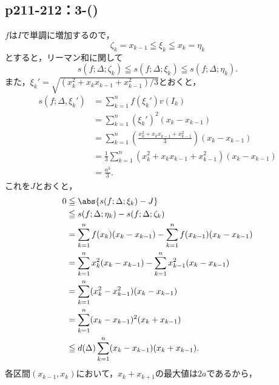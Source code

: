 \subsection*{p211-212：3-()}
\begin{tanswer}
    $f$は$I$で単調に増加するので，
    \[
        \zeta_k = x_{k-1} \leqq \xi_k \leqq x_k=\eta_k
    \]
    とすると，リーマン和に関して
    \[
        s(f;\Delta ; \zeta_k ) \leqq s(f;\Delta;\xi_k) \leqq s(f;\Delta;\eta_k).
    \]
    また，$\xi_k' = \sqrt{(x_k ^2 + x_k x_{k-1}+x_{k-1} ^2)/3} $とおくと，
    \begin{align*}
        s(f;\Delta,\xi_k' ) & = \sum_{k=1}^{n} f(\xi_k') v(I_k)                                                         \\
                            & = \sum_{k=1}^{n} (\xi_k')^2 (x_k - x_{k-1})                                               \\
                            & = \sum_{k=1}^{n} \left( \frac{x_k^2 + x_k x_{k-1} + x_{k-1}^2}{3} \right) (x_k - x_{k-1}) \\
                            & = \frac{1}{3} \sum_{k=1}^{n} (x_k^2 + x_k x_{k-1} + x_{k-1}^2) (x_k - x_{k-1})            \\
                            & = \frac{a^3}{3}.
    \end{align*}
    これを$J$とおくと，
    \begin{align*}
        0 & \leqq \abs{ s(f;\Delta; \xi_k) - J }                                                \\
          & \leqq s(f;\Delta;\eta_k) - s(f;\Delta ; \zeta_k )                                   \\
          & = \sum_{k=1}^{n} f(x_k) (x_k - x_{k-1}) - \sum_{k=1}^{n} f(x_{k-1}) (x_k - x_{k-1}) \\
          & = \sum_{k=1}^{n} x_k^2 (x_k - x_{k-1}) - \sum_{k=1}^{n} x_{k-1}^2 (x_k - x_{k-1})   \\
          & = \sum_{k=1}^{n} (x_k^2 - x_{k-1}^2) (x_k - x_{k-1})                                \\
          & = \sum_{k=1}^{n} (x_k - x_{k-1})^2 (x_k + x_{k-1})                                  \\
          & \leqq d(\Delta) \sum_{k=1}^{n} (x_k - x_{k-1}) (x_k + x_{k-1}).
    \end{align*}
    各区間$(x_{k-1},x_k)$において，$x_k + x_{k+1}$の最大値は$2a$であるから，

\end{tanswer}
